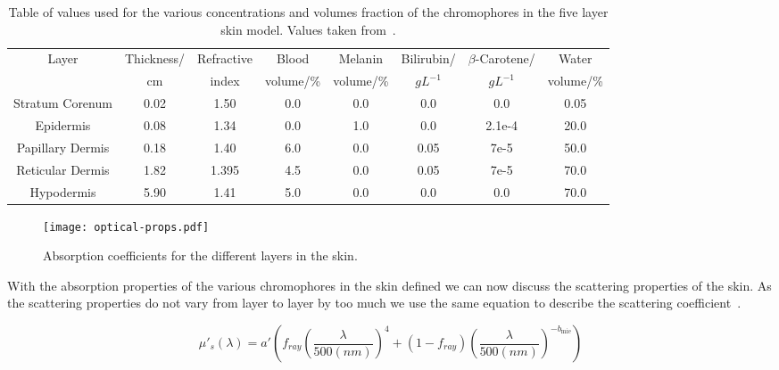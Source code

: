 \begin{table}[!tbhp] 
    \begin{adjustwidth}{-.5in}{-.5in}  

  \begin{center}
  \begin{tabular}{|c|c|c|c|c|c|c|c|}
  \hline
  Layer & Thickness/ & Refractive & Blood & Melanin & Bilirubin/ & $\beta$-Carotene/ & Water\\
    &cm & index & volume/\% & volume/\% & $gL^{-1}$ & $gL^{-1}$ & volume/\%\\
  \hline
  Stratum Corenum  & 0.02 & 1.50  & 0.0 & 0.0 & 0.0  & 0.0 & 0.05\\
  Epidermis        & 0.08 & 1.34  & 0.0 & 1.0 & 0.0  & 2.1e-4 & 20.0\\
  Papillary Dermis & 0.18 & 1.40  & 6.0 & 0.0 & 0.05 & 7e-5 & 50.0\\
  Reticular Dermis & 1.82 & 1.395 & 4.5 & 0.0 & 0.05 & 7e-5 & 70.0\\
  Hypodermis       & 5.90 & 1.41  & 5.0 & 0.0 & 0.0  & 0.0 & 70.0\\

  \hline
  \end{tabular}
    \caption{Table of values used for the various concentrations and volumes fraction of the chromophores in the five layer skin model. Values taken from~\cite{krishnaswamy2004biophysically,meglinski2002quantitative,campbell20153d,iglesias2015biophysically}.}
  \label{tab:optpropsvals}
  \end{center}
      \end{adjustwidth}

\end{table}


\begin{figure}[!htpb]
  \centering
  \texttt{[image: optical-props.pdf]}
  \caption{Absorption coefficients for the different layers in the skin.}
  \label{fig:absoplayers}
\end{figure}


With the absorption properties of the various chromophores in the skin defined we can now discuss the scattering properties of the skin.
As the scattering properties do not vary from layer to layer by too much we use the same equation to describe the scattering coefficient~\cite{jacques2013optical,iglesias2015biophysically,louisethesis}.

\begin{equation}
\mu'_s(\lambda)=a'\left(f_{ray}\left(\frac{\lambda}{500(nm)}\right)^4+(1-f_{ray})\left(\frac{\lambda}{500(nm)}\right)^{-b_{\text{mie}}}\right)
\label{eqn:scattrest}
\end{equation}

